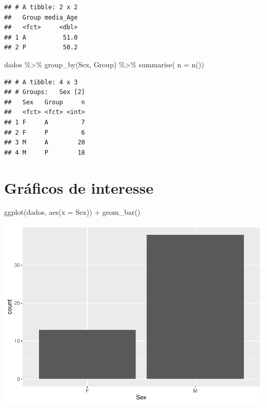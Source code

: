 \documentclass[
]{article}
\newenvironment{Shaded}{\begin{snugshade}}{\end{snugshade}}
\newcommand{\AttributeTok}[1]{\textcolor[rgb]{0.77,0.63,0.00}{#1}}
\newcommand{\FunctionTok}[1]{\textcolor[rgb]{0.00,0.00,0.00}{#1}}
\newcommand{\NormalTok}[1]{#1}
\newcommand{\SpecialCharTok}[1]{\textcolor[rgb]{0.00,0.00,0.00}{#1}}
\begin{document}
\begin{verbatim}
## # A tibble: 2 x 2
##   Group media_Age
##   <fct>     <dbl>
## 1 A          51.0
## 2 P          50.2
\end{verbatim}

\begin{Shaded}
\begin{Highlighting}[]
\NormalTok{dados }\SpecialCharTok{\%\textgreater{}\%} 
  \FunctionTok{group\_by}\NormalTok{(Sex, Group) }\SpecialCharTok{\%\textgreater{}\%} 
  \FunctionTok{summarise}\NormalTok{( }\AttributeTok{n =} \FunctionTok{n}\NormalTok{())}
\end{Highlighting}
\end{Shaded}

\begin{verbatim}
## # A tibble: 4 x 3
## # Groups:   Sex [2]
##   Sex   Group     n
##   <fct> <fct> <int>
## 1 F     A         7
## 2 F     P         6
## 3 M     A        20
## 4 M     P        18
\end{verbatim}

\hypertarget{gruxe1ficos-de-interesse}{%
\section{Gráficos de interesse}\label{gruxe1ficos-de-interesse}}

\begin{Shaded}
\begin{Highlighting}[]
\FunctionTok{ggplot}\NormalTok{(dados, }\FunctionTok{aes}\NormalTok{(}\AttributeTok{x =}\NormalTok{ Sex)) }\SpecialCharTok{+}
  \FunctionTok{geom\_bar}\NormalTok{()}
\end{Highlighting}
\end{Shaded}

\includegraphics{EDA__files/figure-latex/unnamed-chunk-3-1.pdf}
\end{document}
